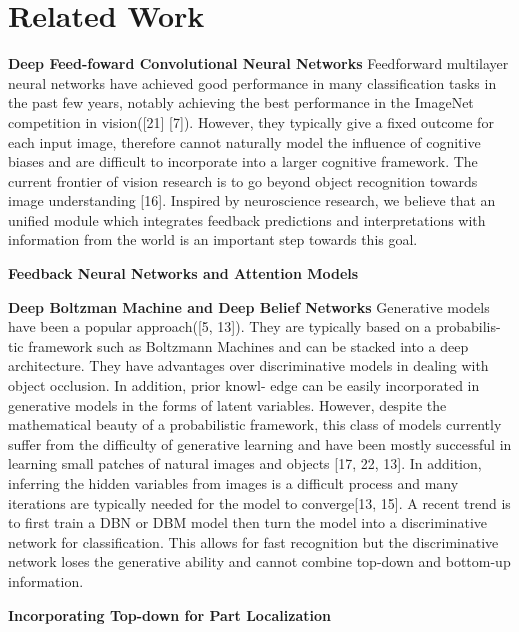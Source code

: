 \section{Related Work}
\label{sec:related_work}

\textbf{Deep Feed-foward Convolutional Neural Networks}
Feedforward multilayer neural networks have achieved good performance in many classification tasks in the past few years, notably achieving the best performance in the ImageNet competition in vision([21] [7]). However, they typically give a fixed outcome for each input image, therefore cannot naturally model the influence of cognitive biases and are difficult to incorporate into a larger cognitive framework. The current frontier of vision research is to go beyond object recognition towards image understanding [16]. Inspired by neuroscience research, we believe that an unified module which integrates feedback predictions and interpretations with information from the world is an important step towards this goal. 

\textbf{Feedback Neural Networks and Attention Models}

\textbf{Deep Boltzman Machine and Deep Belief Networks}
Generative models have been a popular approach([5, 13]). They are typically based on a probabilis- tic framework such as Boltzmann Machines and can be stacked into a deep architecture. They have advantages over discriminative models in dealing with object occlusion. In addition, prior knowl- edge can be easily incorporated in generative models in the forms of latent variables. However, despite the mathematical beauty of a probabilistic framework, this class of models currently suffer from the difficulty of generative learning and have been mostly successful in learning small patches of natural images and objects [17, 22, 13]. In addition, inferring the hidden variables from images is a difficult process and many iterations are typically needed for the model to converge[13, 15]. A recent trend is to first train a DBN or DBM model then turn the model into a discriminative network for classification. This allows for fast recognition but the discriminative network loses the generative ability and cannot combine top-down and bottom-up information. 

\textbf{Incorporating Top-down for Part Localization}

